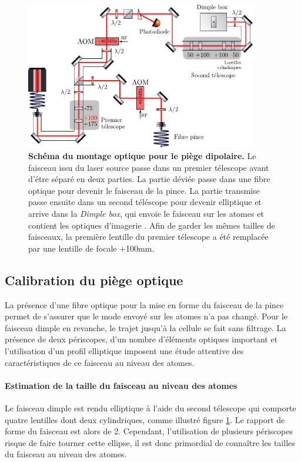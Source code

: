 \begin{figure}
\centering
\includegraphics[width=0.9\textwidth]{../Fig/Modif_exp/optique_1070.pdf}
\caption{\textbf{Schéma du montage optique pour le piège dipolaire.} Le faisceau issu du laser source passe dans un premier télescope avant d'étre séparé en deux parties. La partie déviée passe dans une fibre optique pour devenir le faisceau de la pince. La partie transmise passe ensuite dans un second téléscope pour devenir elliptique et arrive dans la \emph{Dimple box}, qui envoie le faisceau sur les atomes et contient les optiques d'imagerie \citep{muller2015coherent}. Afin de garder les mêmes tailles de faisceaux, la première lentille du premier télescope a été remplacée par une lentille de focale +100mm.}
\label{fig:optique_1070}
\end{figure}


\subsection{Calibration du piège optique}
La présence d'une fibre optique pour la mise en forme du faisceau de la pince permet de s'assurer que le mode envoyé sur les atomes n'a pas changé. Pour le faisceau dimple en revanche, le trajet jusqu'à la cellule se fait sans filtrage. La présence de deux périscopes, d'un nombre d'éléments optiques important et l'utilisation d'un profil elliptique imposent une étude attentive des caractéristiques de ce faisceau au niveau des atomes.



\paragraph*{Estimation de la taille du faisceau au niveau des atomes}
Le faisceau dimple est rendu elliptique à l'aide du second télescope qui comporte quatre lentilles dont deux cylindriques, comme illustré figure \ref{fig:optique_1070}. Le rapport de forme du faisceau est alors de 2. Cependant, l'utilisation de plusieurs périscopes risque de faire tourner cette ellipse, il est donc primordial de connaître les tailles du faisceau au niveau des atomes.

